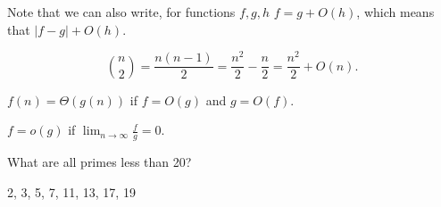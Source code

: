
\begin{note}
	Note that we can also write, for functions \( f, g, h \) \( f = g + O(h) \), which means that \( |f - g| + O(h) \).
\end{note}

\begin{eg}
	\[ \binom{n}{2} = \frac{n(n-1)}{2} = \frac{n^{2}}{2} - \frac{n}{2} = \frac{n^{2}}{2} + O(n) .\]
\end{eg}

\begin{definition}
	\( f(n) = \Theta (g(n)) \) if \( f=O(g) \) and \( g=O(f) \).
\end{definition}

\begin{definition}
	\( f = o(g) \) if \( \lim_{n \to \infty} \frac{f}{g} = 0 \).
\end{definition}

\begin{eg}
	What are all primes less than 20?
\end{eg}
\begin{explanation}
	2, 3, 5, 7, 11, 13, 17, 19
\end{explanation}
